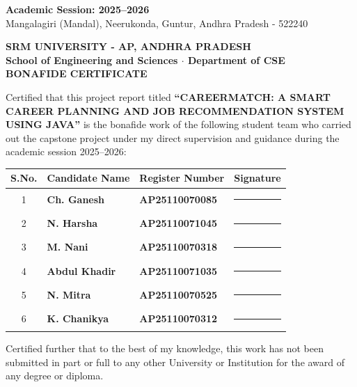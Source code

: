 \documentclass[11pt,a4paper]{report}
\begin{document}
\begin{titlepage}
    \vfill
    {\large \textbf{Academic Session: 2025--2026}}\\[0.15cm]
    {\normalsize Mangalagiri (Mandal), Neerukonda, Guntur, Andhra Pradesh - 522240}
\end{titlepage}

\newpage
\thispagestyle{plain}
\begin{center}
    {\Large \textbf{SRM UNIVERSITY - AP, ANDHRA PRADESH}}\\[0.15cm]
    {\normalsize \textbf{School of Engineering and Sciences $\cdot$ Department of CSE}}\\[0.5cm]
    {\Large \textbf{BONAFIDE CERTIFICATE}}\\[0.4cm]
\end{center}

Certified that this project report titled \textbf{``CAREERMATCH: A SMART CAREER PLANNING AND JOB RECOMMENDATION SYSTEM USING JAVA''} is the bonafide work of the following student team who carried out the capstone project under my direct supervision and guidance during the academic session 2025--2026:

\begin{table}[H]
    \centering
    \small
    \begin{tabular}{cllc}
        \toprule
        \textbf{S.No.} & \textbf{Candidate Name} & \textbf{Register Number} & \textbf{Signature} \\
        \midrule
        1 & \textbf{Ch. Ganesh} & \textbf{AP25110070085} & \rule{3.5cm}{0.4pt} \\
        2 & \textbf{N. Harsha} & \textbf{AP25110071045} & \rule{3.5cm}{0.4pt} \\
        3 & \textbf{M. Nani} & \textbf{AP25110070318} & \rule{3.5cm}{0.4pt} \\
        4 & \textbf{Abdul Khadir} & \textbf{AP25110071035} & \rule{3.5cm}{0.4pt} \\
        5 & \textbf{N. Mitra} & \textbf{AP25110070525} & \rule{3.5cm}{0.4pt} \\
        6 & \textbf{K. Chanikya} & \textbf{AP25110070312} & \rule{3.5cm}{0.4pt} \\
        \bottomrule
    \end{tabular}
\end{table}

Certified further that to the best of my knowledge, this work has not been submitted in part or full to any other University or Institution for the award of any degree or diploma.
\end{document}
